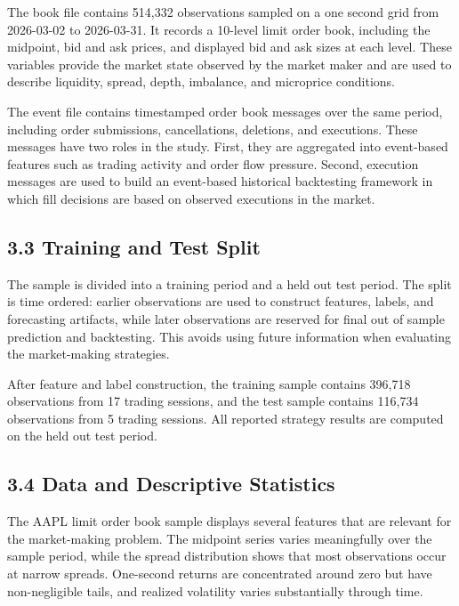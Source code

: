 \documentclass[12pt,a4paper]{article}
\begin{document}
The book file contains 514,332 observations sampled on a one second grid
from 2026-03-02 to 2026-03-31. It records a 10-level limit order book,
including the midpoint, bid and ask prices, and displayed bid and ask
sizes at each level. These variables provide the market state observed
by the market maker and are used to describe liquidity, spread, depth,
imbalance, and microprice conditions.

The event file contains timestamped order book messages over the same
period, including order submissions, cancellations, deletions, and
executions. These messages have two roles in the study. First, they are
aggregated into event-based features such as trading activity and order
flow pressure. Second, execution messages are used to build an
event-based historical backtesting framework in which fill decisions are
based on observed executions in the market.

\subsection{3.3 Training and Test Split}\label{training-and-test-split}

The sample is divided into a training period and a held out test period.
The split is time ordered: earlier observations are used to construct
features, labels, and forecasting artifacts, while later observations
are reserved for final out of sample prediction and backtesting. This
avoids using future information when evaluating the market-making
strategies.

After feature and label construction, the training sample contains
396,718 observations from 17 trading sessions, and the test sample
contains 116,734 observations from 5 trading sessions. All reported
strategy results are computed on the held out test period.

\subsection{3.4 Data and Descriptive
Statistics}\label{data-and-descriptive-statistics}

The AAPL limit order book sample displays several features that are
relevant for the market-making problem. The midpoint series varies
meaningfully over the sample period, while the spread distribution shows
that most observations occur at narrow spreads. One-second returns are
concentrated around zero but have non-negligible tails, and realized
volatility varies substantially through time.
\end{document}
